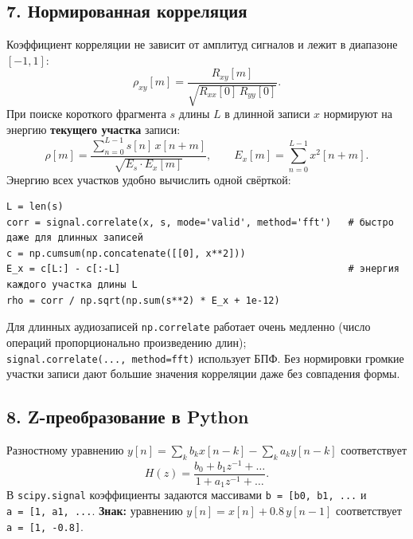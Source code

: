 \documentclass[12pt,a4paper,openany]{book}
\begin{document}
\subsection*{7. Нормированная корреляция}

Коэффициент корреляции не зависит от амплитуд сигналов и лежит в диапазоне \([-1, 1]\):
\[
\rho_{xy}[m] = \frac{R_{xy}[m]}{\sqrt{R_{xx}[0]\,R_{yy}[0]}}.
\]
При поиске короткого фрагмента \(s\) длины \(L\) в длинной записи \(x\) нормируют на энергию \textbf{текущего участка} записи:
\[
\rho[m] = \frac{\sum_{n=0}^{L-1} s[n]\,x[n+m]}{\sqrt{E_s \cdot E_x[m]}}, \qquad E_x[m] = \sum_{n=0}^{L-1} x^2[n+m].
\]
Энергию всех участков удобно вычислить одной свёрткой:

\begin{Verbatim}[fontsize=\small, breaklines, breakanywhere]
L = len(s)
corr = signal.correlate(x, s, mode='valid', method='fft')   # быстро даже для длинных записей
c = np.cumsum(np.concatenate([[0], x**2]))
E_x = c[L:] - c[:-L]                                        # энергия каждого участка длины L
rho = corr / np.sqrt(np.sum(s**2) * E_x + 1e-12)
\end{Verbatim}

Для длинных аудиозаписей \texttt{np.\allowbreak{}correlate} работает очень медленно (число операций пропорционально произведению длин); \texttt{signal.\allowbreak{}correlate(\allowbreak{}.\allowbreak{}.\allowbreak{}.\allowbreak{},\allowbreak{}\ method=\allowbreak{}\textquotesingle{}\allowbreak{}fft\textquotesingle{}\allowbreak{})} использует БПФ.
Без нормировки громкие участки записи дают большие значения корреляции даже без совпадения формы.

\subsection*{8. Z-преобразование в Python}

Разностному уравнению \(y[n] = \sum_k b_k x[n-k] - \sum_k a_k y[n-k]\) соответствует
\[
H(z) = \frac{b_0 + b_1 z^{-1} + \dots}{1 + a_1 z^{-1} + \dots}.
\]
В \texttt{scipy.\allowbreak{}signal} коэффициенты задаются массивами \texttt{b\ =\allowbreak{}\ {[}b0,\allowbreak{}\ b1,\allowbreak{}\ .\allowbreak{}.\allowbreak{}.\allowbreak{}{]}} и \texttt{a\ =\allowbreak{}\ {[}1,\allowbreak{}\ a1,\allowbreak{}\ .\allowbreak{}.\allowbreak{}.\allowbreak{}{]}}. \textbf{Знак:} уравнению \(y[n] = x[n] + 0.8\,y[n-1]\) соответствует \texttt{a\ =\allowbreak{}\ {[}1,\allowbreak{}\ -0.\allowbreak{}8{]}}.
\end{document}
